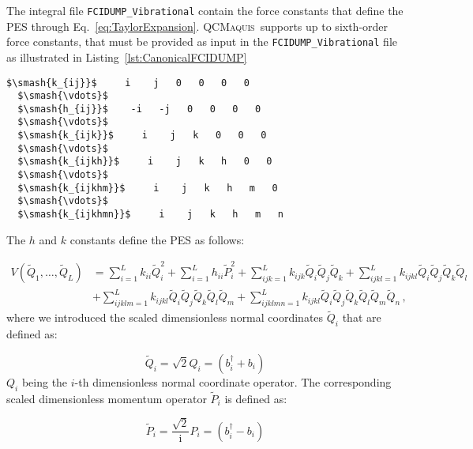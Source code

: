 \documentclass[bibliography=totoc,12pt,a4paper]{scrartcl}
\newcommand{\qcm}{\textsc{QCMaquis}}
\begin{document}
The integral file \texttt{FCIDUMP\_Vibrational} contain the force constants that define the PES through Eq.~\ref{eq:TaylorExpansion}.
\qcm\ supports up to sixth-order force constants, that must be provided as input in the \texttt{FCIDUMP\_Vibrational} file as illustrated in Listing~\ref{lst:CanonicalFCIDUMP}
\vspace{.5cm}
\begin{lstlisting}[language=qcmaquis,caption={Example of an vDMRG integral file for the potential
											  expressed in the canonical quantization format.},
				   label=lst:CanonicalFCIDUMP, mathescape=true, rulecolor=\color{black}]
  $\smash{k_{ij}}$     i    j   0   0   0   0
  $\smash{\vdots}$
  $\smash{h_{ij}}$    -i   -j   0   0   0   0
  $\smash{\vdots}$
  $\smash{k_{ijk}}$     i    j   k   0   0   0
  $\smash{\vdots}$
  $\smash{k_{ijkh}}$     i    j   k   h   0   0
  $\smash{\vdots}$
  $\smash{k_{ijkhm}}$     i    j   k   h   m   0
  $\smash{\vdots}$
  $\smash{k_{ijkhmn}}$     i    j   k   h   m   n
\end{lstlisting}
\vspace{.5cm}
The $h$ and $k$ constants define the PES as follows:

\begin{equation}
  \begin{aligned}
    V(\tilde{Q}_1, \ldots, \tilde{Q}_L) 
      &= \sum_{i=1}^L k_{ii} \tilde{Q}_i^2 + \sum_{i=1}^L h_{ii} \tilde{P}_i^2 
      + \sum_{ijk=1}^L k_{ijk} \tilde{Q}_i \tilde{Q}_j \tilde{Q}_k
      + \sum_{ijkl=1}^L k_{ijkl} \tilde{Q}_i \tilde{Q}_j \tilde{Q}_k \tilde{Q}_l \\
      &+ \sum_{ijklm=1}^L k_{ijkl} \tilde{Q}_i \tilde{Q}_j \tilde{Q}_k \tilde{Q}_l \tilde{Q}_m
      + \sum_{ijklmn=1}^L k_{ijkl} \tilde{Q}_i \tilde{Q}_j \tilde{Q}_k \tilde{Q}_l \tilde{Q}_m \tilde{Q}_n \, ,
  \end{aligned}
  \label{eq:PES_Representation}
\end{equation}
%
where we introduced the scaled dimensionless normal coordinates $\tilde{Q}_i$ that are defined as:

\begin{equation}
  \tilde{Q}_i = \sqrt{2} Q_i = \left( b_i^\dagger + b_i \right)
  \label{eq:ScaledNM}
\end{equation}
%
$Q_i$ being the $i$-th dimensionless normal coordinate operator.
The corresponding scaled dimensionless momentum operator $\tilde{P}_i$ is defined as:

\begin{equation}
  \tilde{P}_i = \frac{\sqrt{2}}{\mathrm{i}} P_i = \left( b_i^\dagger - b_i \right)
  \label{eq:ScaledNM_Momentum}
\end{equation}
\end{document}

